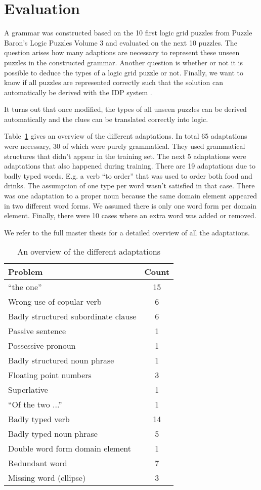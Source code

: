 \section{Evaluation}
A grammar was constructed based on the 10 first logic grid puzzles from Puzzle Baron's Logic Puzzles Volume 3 \cite{logigrammen} and evaluated on the next 10 puzzles. The question arises how many adaptions are necessary to represent these unseen puzzles in the constructed grammar. Another question is whether or not it is possible to deduce the types of a logic grid puzzle or not. Finally, we want to know if all puzzles are represented correctly such that the solution can automatically be derived with the IDP system \cite{IDP}.

It turns out that once modified, the types of all unseen puzzles can be derived automatically and the clues can be translated correctly into logic.

Table~\ref{tbl:resultaten} gives an overview of the different adaptations. In total 65 adaptations were necessary, 30 of which were purely grammatical. They used grammatical structures that didn't appear in the training set. The next 5 adaptations were adaptations that also happened during training. There are 19 adaptations due to badly typed words. E.g. a verb ``to order'' that was used to order both food and drinks. The assumption of one type per word wasn't satisfied in that case. There was one adaptation to a proper noun because the same domain element appeared in two different word forms. We assumed there is only one word form per domain element. Finally, there were 10 cases where an extra word was added or removed.

We refer to the full master thesis for a detailed overview of all the adaptations.

\begin{table}[h]
  \centering
  \begin{tabular}{lc}
    \hline
    \textbf{Problem} & \textbf{Count} \\ 
    \hline
    ``the one'' & 15 \\
    Wrong use of copular verb & 6 \\
    Badly structured subordinate clause & 6 \\
    Passive sentence & 1 \\
    Possessive pronoun & 1 \\
    Badly structured noun phrase & 1 \\
    \hline
    Floating point numbers & 3 \\
    Superlative & 1 \\
    ``Of the two ...'' & 1 \\
    \hline
    Badly typed verb & 14 \\
    Badly typed noun phrase & 5 \\
    \hline
    Double word form domain element & 1 \\
    \hline
    Redundant word & 7 \\
    Missing word (ellipse) & 3 \\
    \hline
  \end{tabular}
  \caption{An overview of the different adaptations}
  \label{tbl:resultaten}
\end{table}
